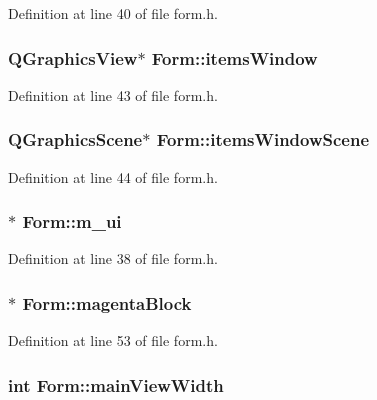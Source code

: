Definition at line 40 of file form.h.\hypertarget{class_form_a51d3d962a2815f75b507506e7ab94e4a}{
\subsubsection[{itemsWindow}]{\setlength{\rightskip}{0pt plus 5cm}QGraphicsView$\ast$ {\bf Form::itemsWindow}}}
\label{class_form_a51d3d962a2815f75b507506e7ab94e4a}


Definition at line 43 of file form.h.\hypertarget{class_form_ad05b2988fa73fab67b1794dae8ebe1b6}{
\subsubsection[{itemsWindowScene}]{\setlength{\rightskip}{0pt plus 5cm}QGraphicsScene$\ast$ {\bf Form::itemsWindowScene}}}
\label{class_form_ad05b2988fa73fab67b1794dae8ebe1b6}


Definition at line 44 of file form.h.\hypertarget{class_form_a719f9ac1c34536d610446a2a8f65656c}{
\subsubsection[{m\_\-ui}]{$\ast$ {\bf Form::m\_\-ui}}}
\label{class_form_a719f9ac1c34536d610446a2a8f65656c}


Definition at line 38 of file form.h.\hypertarget{class_form_ae98adaad3d9264c2c76c0977b44943c6}{
\subsubsection[{magentaBlock}]{$\ast$ {\bf Form::magentaBlock}}}
\label{class_form_ae98adaad3d9264c2c76c0977b44943c6}


Definition at line 53 of file form.h.\hypertarget{class_form_a132aa4e6d4dcdbdde29762fcc6497cac}{
\subsubsection[{mainViewWidth}]{\setlength{\rightskip}{0pt plus 5cm}int {\bf Form::mainViewWidth}}}
\label{class_form_a132aa4e6d4dcdbdde29762fcc6497cac}


